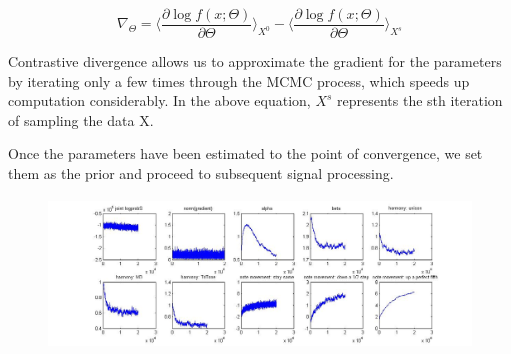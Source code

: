 \documentclass{article}
\begin{document}
\[\nabla_{\Theta} = \langle\frac{\partial\log{f(x;\Theta)}}{\partial\Theta}\rangle_{X^0} - \langle\frac{\partial\log{f(x;\Theta)}}{\partial\Theta}\rangle_{X^s}\]

Contrastive divergence allows us to approximate the gradient for the parameters by iterating only a few times through the MCMC process, which speeds up computation considerably.  In the above equation, $X^s$ represents the sth iteration of sampling the data X.

Once the parameters have been estimated to the point of convergence, we set them as the prior and proceed to subsequent signal processing.

\begin{figure}
\includegraphics[height=40mm]{paramsnew(20000).jpg}
\end{figure}
\end{document}
